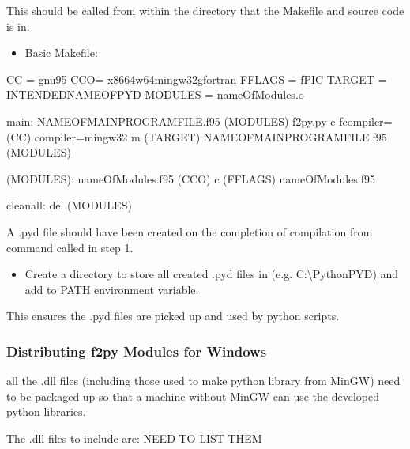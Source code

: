 \documentclass[letterpaper,10pt,english]{sphinxmanual}
\begin{document}
 This should be called from within the directory that the
Makefile and source code is in.
\begin{itemize}
\item {} 
Basic Makefile:

\end{itemize}

%
\begin{sphinxVerbatim}[commandchars=\\\{\}]
CC = gnu95
CCO= x86\PYGZus{}64\PYGZhy{}w64\PYGZhy{}mingw32\PYGZhy{}gfortran
FFLAGS = \PYGZhy{}fPIC
TARGET = INTENDED\PYGZus{}NAME\PYGZus{}OF\PYGZus{}PYD
MODULES = nameOfModules.o

main:  NAMEOFMAINPROGRAMFILE.f95  \PYGZdl{}(MODULES)
 f2py.py \textendash{}c \textendash{}\PYGZhy{}fcompiler=\PYGZdl{}(CC) \textendash{}\PYGZhy{}compiler=mingw32 \textendash{}m \PYGZdl{}(TARGET) NAMEOFMAINPROGRAMFILE.f95 \PYGZdl{}(MODULES)

\PYGZdl{}(MODULES): nameOfModules.f95
\PYGZdl{}(CCO) \textendash{}c  \PYGZdl{}(FFLAGS)  nameOfModules.f95

cleanall:
   \PYGZhy{}del \PYGZdl{}(MODULES)
\end{sphinxVerbatim}

 A .pyd file should have been created on the completion of
compilation from command called in step 1.
\begin{itemize}
\item {} 
Create a directory to store all created .pyd files in (e.g.
C:\textbackslash{}PythonPYD) and add to PATH environment variable.

\end{itemize}

This ensures the .pyd files are picked up and used by python scripts.


\subsubsection{Distributing f2py Modules for Windows}
\label{\detokenize{DevelopmentGuidelines:distributing-f2py-modules-for-windows}}
 all the .dll files (including those used to make python
library from MinGW) need to be packaged up so that a machine without MinGW can use the
developed python libraries.

The .dll files to include are: NEED TO LIST THEM
\end{document}
